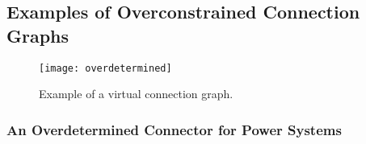 \subsection{Examples of Overconstrained Connection Graphs}

\begin{example}
\begin{figure}[H]
\caption{Example of a virtual connection graph.}
\texttt{[image: overdetermined]}
\end{figure}
\end{example}

\subsubsection{An Overdetermined Connector for Power Systems}

